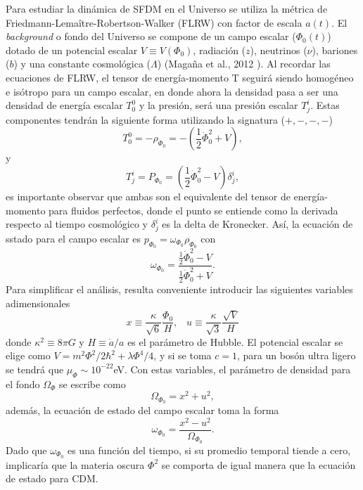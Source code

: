 \documentclass[a4paper,openright,10pt, oneside, final]{book}
\begin{document}
Para estudiar la dinámica de SFDM en el Universo se utiliza la métrica de Friedmann-Lemaître-Robertson-Walker (FLRW) con factor de escala $a(t)$. El \textit{background} o fondo del Universo se compone de un campo escalar ($\Phi_{0}(t)$) dotado de un potencial escalar $V \equiv V(\Phi_{0})$, radiación ($z$), neutrinos ($\nu$), bariones ($b$) y una constante cosmológica ($\Lambda$) (Magaña et al., 2012 \cite{1.3.02.1}). Al recordar las ecuaciones de FLRW, el tensor de energía-momento T seguirá siendo homogéneo e isótropo para un campo escalar,  en donde ahora la densidad pasa a ser una densidad de energía escalar $T_{0}^{0}$ y la presión, será una presión escalar $T_{j}^{i}$. Estas componentes tendrán la siguiente forma utilizando la signatura ($+,-,-,-$)
\begin{equation}
T_{0}^{0}=-\rho_{\Phi_{0}}=-\left(\frac{1}{2}\dot{\Phi}_{0}^{2} + V \right),\label{eqn 1.54}
\end{equation}
y
\begin{equation}
T_{j}^{i}=P_{\Phi_{0}}=\left(\frac{1}{2} \dot{\Phi}_{0}^{2}-V \right)\delta_{j}^{i},\label{eqn 1.55}
\end{equation}
es importante observar que ambas son el equivalente del tensor de energía-momento para fluidos perfectos, donde el punto se entiende como la derivada respecto al tiempo cosmológico y $\delta_{j}^{i}$ es la delta de Kronecker. Así, la ecuación de sstado para el campo escalar es $p_{\Phi_{0}}=\omega_{\Phi_{0}}\rho_{\Phi_{0}}$ con
\begin{equation}
\omega_{\Phi_{0}} = \frac{\frac{1}{2}\dot{\Phi}_{0}^{2}-V}{\frac{1}{2}\dot{\Phi}_{0}^{2}+V}.\label{eqn 1.56}
\end{equation}
Para simplificar el análisis, resulta conveniente introducir las siguientes variables adimensionales
\begin{equation}
x\equiv \frac{\kappa}{\sqrt{6}}\frac{\Phi_{0}}{H}, \;\;\; u\equiv\frac{\kappa}{\sqrt{3}}\frac{\sqrt{V}}{H}\label{eqn 1.57}
\end{equation}
donde $\kappa^{2}\equiv 8\pi G$ y $H \equiv \dot{a}/a$ es el parámetro de Hubble. El potencial escalar se elige como $V = m^{2}\Phi^{2}/2\hbar^{2} + \lambda\Phi^{4}/4$, y si se toma $c = 1$, para un bosón ultra ligero se tendrá que $\mu_{\Phi} \sim 10^{-22} $eV. Con estas variables, el parámetro de densidad para el fondo $\Omega_{\Phi}$ se escribe como
\begin{equation}
\Omega_{\Phi_{0}}= x^{2}+u^{2},\label{eqn 1.58}
\end{equation}
además, la ecuación de estado del campo escalar toma la forma
\begin{equation}
\omega_{\Phi_{0}}= \frac{x^{2}-u ^{2}}{\Omega_{\Phi_{0}}}.\label{eqn 1.59}
\end{equation}
Dado que $\omega_{\Phi_{0}}$ es una función del tiempo, si su promedio temporal tiende a cero, implicaría que la materia oscura $\Phi^{2}$ se comporta de igual manera que la ecuación de estado para CDM.
\end{document}
